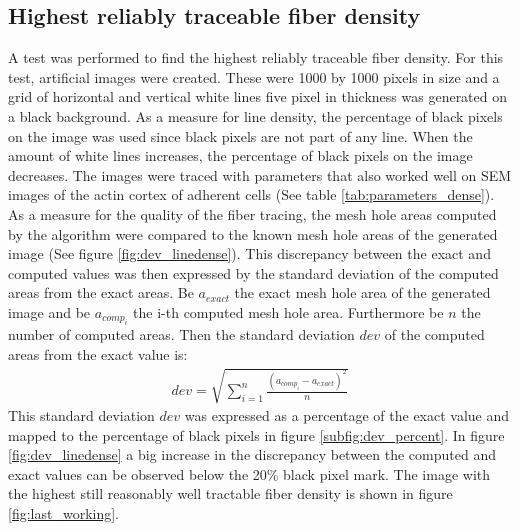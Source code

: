 \documentclass[12pt,english,twocolumn]{revtex4}
\begin{document}
\subsection{Highest reliably traceable fiber density}
A test was performed to find the highest reliably traceable fiber density. For this test, artificial images were created. These were 1000 by 1000 pixels in size and a grid of horizontal and vertical white lines five pixel in thickness was generated on a black background. As a measure for line density, the percentage of black pixels on the image was used since black pixels are not part of any line. When the amount of white lines increases, the percentage of black pixels on the image decreases. The images were traced with parameters that also worked well on SEM images of the actin cortex of adherent cells (See table \ref{tab:parameters_dense}). As a measure for the quality of the fiber tracing, the mesh hole areas computed by the algorithm were compared to the known mesh hole areas of the generated image (See figure \ref{fig:dev_linedense}). This discrepancy between the exact and computed values was then expressed by the standard deviation of the computed areas from the exact areas. Be $a_{exact}$ the exact mesh hole area of the generated image and be $a_{comp_{i}}$ the i-th computed mesh hole area. Furthermore be $n$ the number of computed areas. Then the standard deviation $dev$ of the computed areas from the exact value is:
\begin{align*}
	dev = \sqrt{\sum_{i=1}^n \frac{(a_{comp_{i}} - a_{exact})^2}{n}}
\end{align*}
This standard deviation $dev$ was expressed as a percentage of the exact value and mapped to the percentage of black pixels in figure \ref{subfig:dev_percent}. In figure \ref{fig:dev_linedense} a big increase in the discrepancy between the computed and exact values can be observed below the 20\% black pixel mark. The image with the highest still reasonably well tractable fiber density is shown in figure \ref{fig:last_working}.
\end{document}
